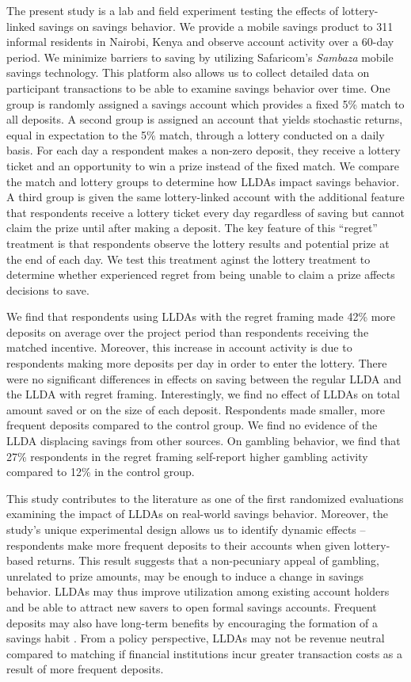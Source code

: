 \documentclass[10pt]{article}
\begin{document}
	The present study is a lab and field experiment testing the effects of lottery-linked savings on savings behavior. We provide a mobile savings product to 311 informal residents in Nairobi, Kenya and observe account activity over a 60-day period. We minimize barriers to saving by utilizing Safaricom's \textit{Sambaza} mobile savings technology. This platform also allows us to collect detailed data on participant transactions to be able to examine savings behavior over time. One group is randomly assigned a savings account which provides a fixed 5\% match to all deposits. A second group is assigned an account that yields stochastic returns, equal in expectation to the 5\% match, through a lottery conducted on a daily basis. For each day a respondent makes a non-zero deposit, they receive a lottery ticket and an opportunity to win a prize instead of the fixed match. We compare the match and lottery groups to determine how LLDAs impact savings behavior. A third group is given the same lottery-linked account with the additional feature that respondents receive a lottery ticket every day regardless of saving but cannot claim the prize until after making a deposit. The key feature of this ``regret'' treatment is that respondents observe the lottery results and potential prize at the end of each day. We test this treatment aginst the lottery treatment to determine whether experienced regret from being unable to claim a prize affects decisions to save.

	We find that respondents using LLDAs with the regret framing made 42\% more deposits on average over the project period than respondents receiving the matched incentive. Moreover, this increase in account activity is due to respondents making more deposits per day in order to enter the lottery. There were no significant differences in effects on saving between the regular LLDA and the LLDA with regret framing. Interestingly, we find no effect of LLDAs on total amount saved or on the size of each deposit. Respondents made smaller, more frequent deposits compared to the control group. We find no evidence of the LLDA displacing savings from other sources. On gambling behavior, we find that 27\% respondents in the regret framing self-report higher gambling activity compared to 12\% in the control group.

	This study contributes to the literature as one of the first randomized evaluations examining the impact of LLDAs on real-world savings behavior. Moreover, the study's unique experimental design allows us to identify dynamic effects -- respondents make more frequent deposits to their accounts when given lottery-based returns. This result suggests that a non-pecuniary appeal of gambling, unrelated to prize amounts, may be enough to induce a change in savings behavior. LLDAs may thus improve utilization among existing account holders and be able to attract new savers to open formal savings accounts. Frequent deposits may also have long-term benefits by encouraging the formation of a savings habit . From a policy perspective, LLDAs may not be revenue neutral compared to matching if financial institutions incur greater transaction costs as a result of more frequent deposits.
\end{document}
